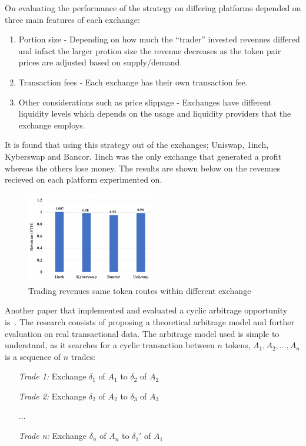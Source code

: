 \noindent On evaluating the performance of the strategy on differing platforms depended on three main features of each exchange:
\begin{enumerate}
    \item Portion size - Depending on how much the ``trader'' invested revenues differed and infact the larger protion size the revenue decreases as the token pair prices are adjusted based on supply/demand.
    \item Transaction fees - Each exchange has their own transaction fee.
    \item Other considerations such as price slippage - Exchanges have different liquidity levels which depends on the usage and liquidity providers that the exchange employs.
\end{enumerate}

It is found that using this strategy out of the exchanges; Uniswap, 1inch, Kyberswap and Bancor. 1inch was the only exchange that generated a profit whereas the others lose money. The results are shown below on the revenues recieved on each platform experimented on.

\begin{figure}[!htb]
    \centering
    \includegraphics[width=0.5\textwidth]{background/Images/DEXArb_results.png}
    \caption{Trading revenues same token routes within different exchange~\cite{boonpeam2021arbitrage}}
\end{figure}

Another paper that implemented and evaluated a cyclic arbitrage opportunity is~\cite{wang_cyclic_2022}. The research consists of proposing a theoretical arbitrage model and further evaluation on real transactional data. The arbitrage model used is simple to understand, as it searches for a cyclic transaction between $n$ tokens, $A_1, A_2, ..., A_n$ is a sequence of $n$ trades:
\begin{center}
    \begin{minipage}[c]{0.4\linewidth}
    \begin{itemize}
        \item[\textit{Trade 1:}] Exchange $\delta_1$ of $A_1$ to $\delta_2$ of $A_2$
        \item[\textit{Trade 2:}] Exchange $\delta_2$ of $A_2$ to $\delta_3$ of $A_3$
        \item[] $\dotsc$
        \item[\textit{Trade n:}] Exchange $\delta_n$ of $A_n$ to $\delta_1'$ of $A_1$
    \end{itemize}
    \end{minipage}
\end{center}

